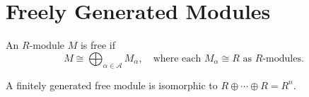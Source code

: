 \section{Freely Generated Modules}
\begin{definition}
    An \(R\)-module \(M\) is free if 
     \[
         M \cong \bigoplus_{\alpha \in \mathcal{A}} M_\alpha, \quad \text{where each } M_\alpha \cong R \text{ as } R\text{-modules}.
    \] 
\end{definition}
\begin{remark}
    A finitely generated free module is isomorphic to \(R \oplus \cdots \oplus R = R^n\).
\end{remark}



